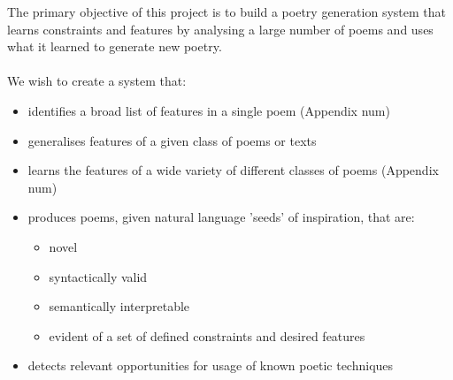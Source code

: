 The primary objective of this project is to build a poetry generation system that learns constraints and features by analysing a large number of poems and uses what it learned to generate new poetry. 
\\\\
We wish to create a system that:
\begin{itemize}
\item{identifies a broad list of features in a single poem (Appendix num)} 
\item{generalises features of a given class of poems or texts}
\item{learns the features of a wide variety of different classes of poems (Appendix num)}
\item{produces poems, given natural language 'seeds' of inspiration, that are:}
	\begin{itemize}
	\setlength{\itemsep}{0pt}
	\item{novel}
	\item{syntactically valid}
	\item{semantically interpretable}
	\item{evident of a set of defined constraints and desired features}
	\end{itemize} 
\item{detects relevant opportunities for usage of known poetic techniques}
\end{itemize}

